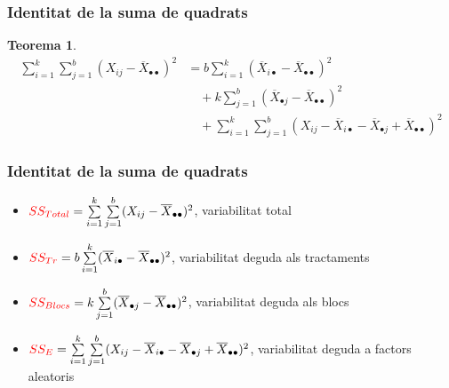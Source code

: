 \documentclass[12pt,t]{beamer}
\newcommand{\red}[1]{\textcolor{red}{#1}}
\theoremstyle{plain}
\newtheorem{teorema}{Teorema}
\theoremstyle{definition}
\begin{document}
\begin{frame}
\frametitle{Identitat de la suma de quadrats}
\begin{teorema}
{\small 
$$
\begin{array}{rl}
\sum\limits_{i=1}^k\sum\limits_{j=1}^b (X_{ij}- \overline{X}_{\bullet\bullet})^2
 & = b\sum\limits_{i=1}^k
(\overline{X}_{i\bullet}-\overline{X}_{\bullet\bullet})^2 \\ & \quad +
k\sum\limits_{j=1}^b (\overline{X}_{\bullet
j}-\overline{X}_{\bullet\bullet})^2 \\ &\quad + \sum\limits_{i=1}^k\sum\limits_{j=1}^b
(X_{ij} - \overline{X}_{i\bullet}- \overline{X}_{\bullet j}+\overline{X}_{\bullet\bullet})^2
\end{array}
$$}
\end{teorema}
\end{frame}



\begin{frame}
\frametitle{Identitat de la suma de quadrats}

\begin{itemize}
\item $\red{SS_{Total}} = \sum\limits_{i=1}^k\sum\limits_{j=1}^b (X_{ij}-
\overline{X}_{\bullet\bullet})^2$, variabilitat total  
\medskip

\item $\red{SS_{Tr}}=b\sum\limits_{i=1}^k
(\overline{X}_{i\bullet}-\overline{X}_{\bullet\bullet})^2$, variabilitat 
deguda als tractaments
\medskip

\item $\red{SS_{Blocs}}=k\sum\limits_{j=1}^b (\overline{X}_{\bullet
j}-\overline{X}_{\bullet\bullet})^2$, variabilitat  deguda als blocs
\medskip

\item $\red{SS_E}= \sum\limits_{i=1}^k\sum\limits_{j=1}^b (X_{ij} - \overline{X}_{i\bullet}-
\overline{X}_{\bullet j}+\overline{X}_{\bullet\bullet})^2$, variabilitat  
deguda a factors aleatoris
\end{itemize}
\end{frame}
\end{document}
